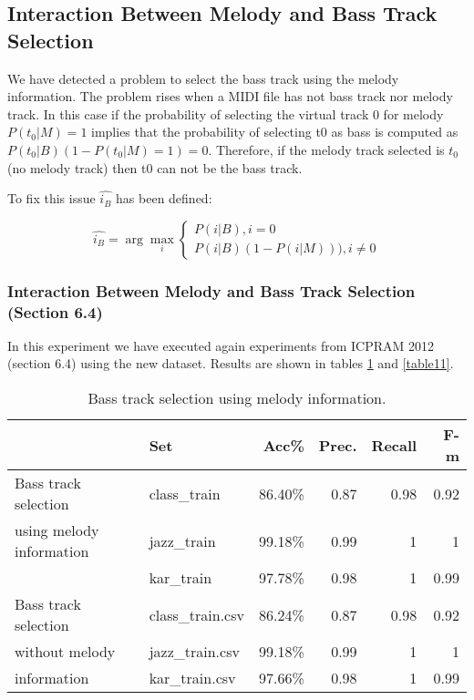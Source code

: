 \documentclass{article}
\begin{document}
\subsection{Interaction Between Melody and Bass Track Selection}\label{sec:multimodal}

We have detected a problem to select the bass track using the melody information. The problem rises when a MIDI file has not bass track nor melody track. In this case if the probability of selecting the virtual track 0 for melody $P(t_0|M)=1$ implies that the probability of selecting t0 as bass is computed as $P(t_0|B)(1-P(t_0|M)=1)=0$. Therefore, if the melody track selected is $t_0$ (no melody track) then t0 can not be the bass track.

To fix this issue $\hat{i_B}$ has been defined:

\begin{equation}
    \hat{i_B}=\arg\max_i\left\{\begin{matrix}
    P(i|B), i=0
    \\ 
    P(i|B)(1-P(i|M))), i \neq 0
    \end{matrix}\right.
\end{equation}





\subsubsection{Interaction Between Melody and Bass Track Selection (Section 6.4)}\label{sec:icepram64}

In this experiment we have executed again experiments from ICPRAM 2012 (section 6.4) using the new dataset. Results are shown in tables \ref{table10} and \ref{table11}.

\begin{table}
\small
\begin{center}
\begin{tabular}{  l | l | r | r | r | r }
\hline
 & Set & Acc\% & Prec. & Recall & F-m \\
\hline
\hline
Bass track selection  & class\_train & 86.40\% & 0.87 & 0.98 & 0.92 \\
using melody information & jazz\_train & 99.18\% & 0.99 & 1 & 1 \\
 & kar\_train & 97.78\% & 0.98 & 1 & 0.99 \\
\hline
Bass track selection  & class\_train.csv & 86.24\% & 0.87 & 0.98 & 0.92 \\
without melody & jazz\_train.csv & 99.18\% & 0.99 & 1 & 1 \\
information & kar\_train.csv & 97.66\% & 0.98 & 1 & 0.99 \\
\hline
\end{tabular}
\caption{Bass track selection using melody information.}
\label{table10}
\end{center}
\end{table}
\end{document}
